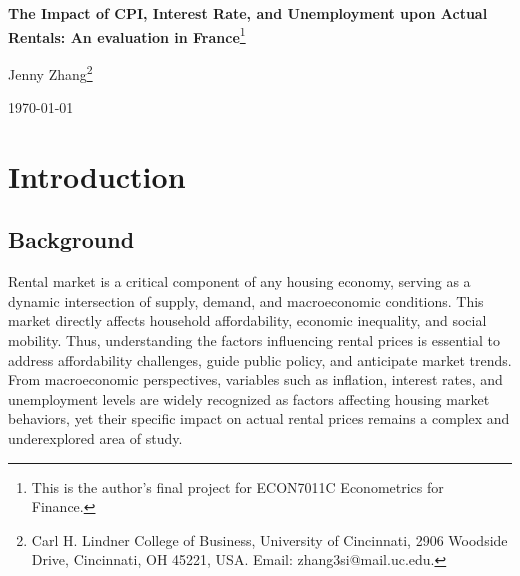 \documentclass[12pt, times]{article}
\renewcommand{\baselinestretch}{1.5}
\begin{document}
\thispagestyle{empty}
\def\thefootnote{\fnsymbol{footnote}}
\begin{center}
  \renewcommand{\baselinestretch}{2}
  \vspace*{2in}

  {\Large
    \textbf{The Impact of CPI, Interest Rate, and Unemployment upon Actual Rentals: An evaluation in France}\footnote{\baselineskip=12pt
      This is the author's final project for ECON7011C Econometrics for Finance.}
  }

  {\Large Jenny Zhang\footnote{\baselineskip=12pt
      Carl H. Lindner College of Business, University of Cincinnati, 2906 Woodside Drive, Cincinnati, OH 45221, USA. Email: zhang3si@mail.uc.edu.}\\} \vspace{0.2in}

  {\Large \today \\}
  \vspace{0.5in}
\end{center}


\newpage
\renewcommand{\baselinestretch}{1.5}
\setcounter{page}{1}
\def\thefootnote{\arabic{footnote}}
\setcounter{footnote}{0}

\doublespacing
\section{Introduction}
\vspace{-1.0em}
\subsection{Background}
Rental market is a critical component of any housing economy, serving as a dynamic intersection of supply, demand, and macroeconomic conditions. This market directly affects household affordability, economic inequality, and social mobility. Thus, understanding the factors influencing rental prices is essential to address affordability challenges, guide public policy, and anticipate market trends. From macroeconomic perspectives, variables such as inflation, interest rates, and unemployment levels are widely recognized as factors affecting housing market behaviors, yet their specific impact on actual rental prices remains a complex and underexplored area of study.
\end{document}
